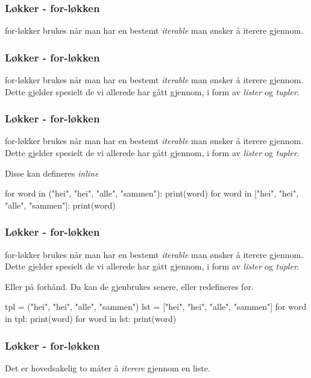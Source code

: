 
\begin{frame}
    \frametitle{Løkker - for-løkken}

    for-løkker brukes når man har en bestemt \textit{iterable} man ønsker å iterere gjennom. 

\end{frame}


\begin{frame}[fragile]
    \frametitle{Løkker - for-løkken}

    for-løkker brukes når man har en bestemt \textit{iterable} man ønsker å iterere gjennom. Dette gjelder spesielt de vi allerede har gått gjennom, i form av \textit{lister} og \textit{tupler}. 

\end{frame}

\begin{frame}[fragile]
    \frametitle{Løkker - for-løkken}

    for-løkker brukes når man har en bestemt \textit{iterable} man ønsker å iterere gjennom. Dette gjelder spesielt de vi allerede har gått gjennom, i form av \textit{lister} og \textit{tupler}. 

    Disse kan defineres \textit{inline}

\begin{python}
for word in ("hei", "hei", "alle", "sammen"): 
    print(word)
for word in ["hei", "hei", "alle", "sammen"]: 
    print(word)
\end{python}

\end{frame}

\begin{frame}[fragile]
    \frametitle{Løkker - for-løkken}

    for-løkker brukes når man har en bestemt \textit{iterable} man ønsker å iterere gjennom. Dette gjelder spesielt de vi allerede har gått gjennom, i form av \textit{lister} og \textit{tupler}. 

    Eller på forhånd. Da kan de gjenbrukes senere, eller redefineres før. 

\begin{python}
tpl = ("hei", "hei", "alle", "sammen")
lst = ["hei", "hei", "alle", "sammen"]
for word in tpl: 
    print(word)
for word in lst: 
    print(word)
\end{python}

\end{frame}

\begin{frame}
    \frametitle{Løkker - for-løkken}

    Det er hovedsakelig to måter å \textit{iterere} gjennom en liste. 

\end{frame}

